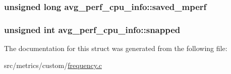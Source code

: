 \subsubsection[{\texorpdfstring{saved\+\_\+mperf}{saved_mperf}}]{\setlength{\rightskip}{0pt plus 5cm}unsigned long avg\+\_\+perf\+\_\+cpu\+\_\+info\+::saved\+\_\+mperf}\hypertarget{structavg__perf__cpu__info_a8f70a19a5bd1ce32bd2f88f82e443fea}{}\label{structavg__perf__cpu__info_a8f70a19a5bd1ce32bd2f88f82e443fea}
\subsubsection[{\texorpdfstring{snapped}{snapped}}]{\setlength{\rightskip}{0pt plus 5cm}unsigned int avg\+\_\+perf\+\_\+cpu\+\_\+info\+::snapped}\hypertarget{structavg__perf__cpu__info_a839deb12ce46ffbee042a7bc33f9d1e1}{}\label{structavg__perf__cpu__info_a839deb12ce46ffbee042a7bc33f9d1e1}


The documentation for this struct was generated from the following file\+:\begin{DoxyCompactItemize}
\item 
src/metrics/custom/\hyperlink{metrics_2custom_2frequency_8c}{frequency.\+c}\end{DoxyCompactItemize}
